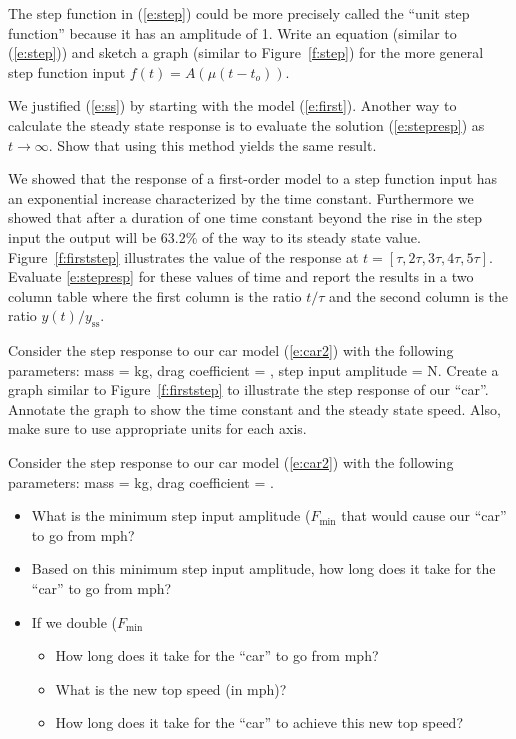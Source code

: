 \begin{ex}
The step function in (\ref{e:step}) could be more precisely called the ``unit step function'' because it has an amplitude of 1.  Write an equation (similar to (\ref{e:step})) and sketch a graph (similar to Figure~\ref{f:step}) for the more general step function input $f(t) = A(\mu(t-t_o))$.
\end{ex}

\begin{ex}
We justified (\ref{e:ss}) by starting with the model (\ref{e:first}).  Another way to calculate the steady state response is to evaluate the solution (\ref{e:stepresp}) as $t \to \infty$.  Show that using this method yields the same result.
\end{ex}

\begin{ex}
We showed that the response of a first-order model to a step function input has an exponential increase characterized by the time constant.  Furthermore we showed that after a duration of one time constant beyond the rise in the step input the output will be 63.2\% of the way to its steady state value.  Figure~\ref{f:firststep} illustrates the value of the response at  $t=[\tau,2\tau,3\tau,4\tau,5\tau]$.  Evaluate \ref{e:stepresp} for these values of time and report the results in a two column table where the first column is the ratio $t/\tau$ and the second column is the ratio $y(t)/y_{\mathrm{ss}}$.
\end{ex}

\begin{ex}
Consider the step response to our car model (\ref{e:car2}) with the following parameters: mass = \unit[750]{kg}, drag coefficient = , step input amplitude = \unit[10,000]{N}.  Create a graph similar to Figure~\ref{f:firststep} to illustrate the step response of our ``car''.  Annotate the graph to show the time constant and the steady state speed.  Also, make sure to use appropriate units for each axis.
\end{ex}

\begin{ex}
Consider the step response to our car model (\ref{e:car2}) with the following parameters: mass = \unit[750]{kg}, drag coefficient = .
\begin{itemize}
\item What is the minimum step input amplitude ($F_{\mathrm{min}}$ that would cause our ``car'' to go from \unit[0--60]{mph}?
\item Based on this minimum step input amplitude, how long does it take for the ``car'' to go from \unit[0--60]{mph}?
\item If we double ($F_{\mathrm{min}}$
 \begin{itemize}
 \item How long does it take for the ``car'' to go from \unit[0--60]{mph}?
 \item What is the new top speed (in mph)?
 \item How long does it take for the ``car'' to achieve this new top speed?
 \end{itemize}
\end{itemize}
\end{ex}

